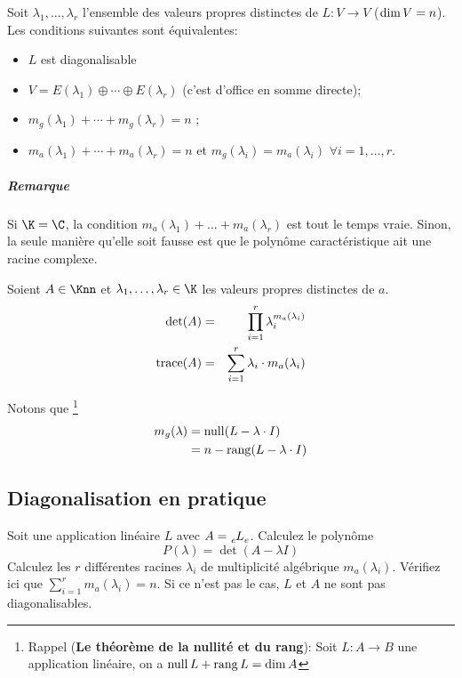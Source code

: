 \begin{myprop}
	Soit $\lambda_1 , \dots , \lambda_r$ l'ensemble des valeurs propres distinctes de $L : V \rightarrow V$ ($\operatorname{dim} V = n$).
	Les conditions suivantes sont équivalentes:
	\begin{itemize}
		\item $L$ est diagonalisable
		\item $V = E(\lambda_1) \oplus \cdots \oplus E(\lambda_r)$ (c'est d'office en somme directe);
		\item $m_g(\lambda_1) + \cdots + m_g(\lambda_r) = n$ ;
		\item $m_a (\lambda_1) + \cdots + m_a (\lambda_r) = n$ et $m_g(\lambda_i) = m_a (\lambda_i)$ $\forall i = 1, \dots, r$.
	\end{itemize}
	\subparagraph{Remarque}
	Si $\K = \C$, la condition $m_a(\lambda_1) + \dots + m_a(\lambda_r)$ est tout le temps vraie.
	Sinon, la seule manière qu'elle soit fausse est que le polynôme caractéristique ait une racine complexe.
\end{myprop}

\begin{myprop}
	Soient $A \in \Knn$ et $\lambda_1, \dots, \lambda_r \in \K$ les valeurs propres distinctes de $a$.
	\begin{eqnarray*}
		\det(A) &=& \prod_{i = 1}^{r} \lambda_i^{m_a(\lambda_i)}\\
		\operatorname{trace}(A) &=& \sum_{i = 1}^{r} \lambda_i \cdot m_a(\lambda_i)
	\end{eqnarray*}
\end{myprop}

\begin{myrem}
	Notons que
	\footnote{Rappel ({\bf Le théorème de la nullité et du rang}):
	Soit $L:A \to B$ une application linéaire, on a $\operatorname{null} L + \operatorname{rang} L = \dim A$}
	\begin{align*}
		m_g(\lambda) & = \operatorname{null} (L - \lambda \cdot I) \\
		& = n - \operatorname{rang} (L - \lambda \cdot I)
	\end{align*}
\end{myrem}

\subsection{Diagonalisation en pratique}
Soit une application linéaire $L$ avec $A = \tensor*[_e]{L}{_e}$.
Calculez le polynôme
\[ P(\lambda) = \det \left( A - \lambda I \right) \]
Calculez les $r$ différentes racines $\lambda_i$ de multiplicité algébrique $m_a(\lambda_i)$.
Vérifiez ici que $\sum_{i=1}^r m_a(\lambda_i) = n$. Si ce n'est pas le cas, $L$ et $A$ ne sont pas diagonalisables.

